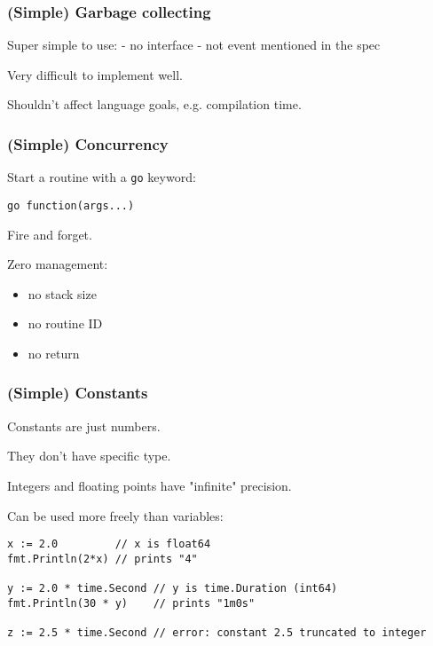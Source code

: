 \documentclass[9pt]{beamer}
\begin{document}
\begin{frame}[fragile]
\frametitle{(Simple) Garbage collecting}


Super simple to use:
- no interface
- not event mentioned in the spec


Very difficult to implement well.


Shouldn't affect language goals, e.g. compilation time.



\end{frame}

\begin{frame}[fragile]
\frametitle{(Simple) Concurrency}


Start a routine with a \texttt{go} keyword:



\begin{verbatim}
go function(args...)

\end{verbatim}


Fire and forget.


Zero management:


\begin{itemize}
\item no stack size
\item no routine ID
\item no return
\end{itemize}


\end{frame}

\begin{frame}[fragile]
\frametitle{(Simple) Constants}


Constants are just numbers.


They don't have specific type.


Integers and floating points have "infinite" precision.


Can be used more freely than variables:



\begin{verbatim}
x := 2.0         // x is float64
fmt.Println(2*x) // prints "4"

y := 2.0 * time.Second // y is time.Duration (int64)
fmt.Println(30 * y)    // prints "1m0s"

z := 2.5 * time.Second // error: constant 2.5 truncated to integer

\end{verbatim}



\end{frame}
\end{document}
